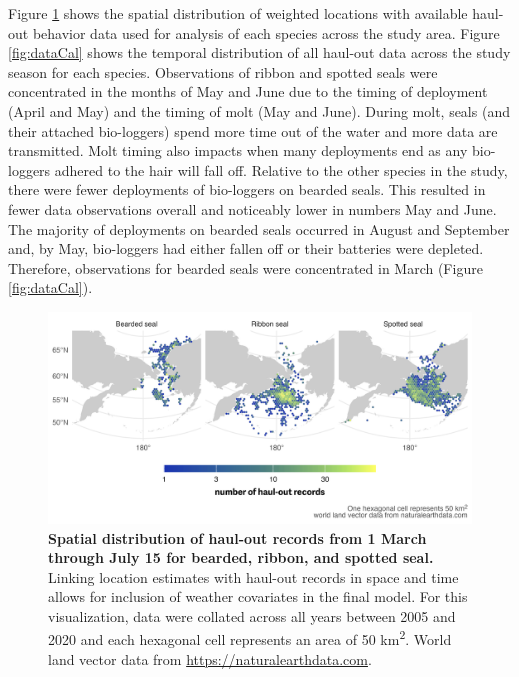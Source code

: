 \documentclass[fleqn,10pt,lineno]{wlpeerj} %
\begin{document}
Figure \ref{fig:dataMap} shows the spatial distribution of weighted locations
with available haul-out behavior data used for analysis of each species across
the study area. Figure \ref{fig:dataCal} shows the temporal distribution of all
haul-out data across the study season for each species. Observations of ribbon
and spotted seals were concentrated in the months of May and June due to the
timing of deployment (April and May) and the timing of molt (May and June).
During molt, seals (and their attached bio-loggers) spend more time out of the
water and more data are transmitted. Molt timing also impacts when many
deployments end as any bio-loggers adhered to the hair will fall off. Relative
to the other species in the study, there were fewer deployments of bio-loggers
on bearded seals. This resulted in fewer data observations overall and
noticeably lower in numbers May and June. The majority of deployments on bearded
seals occurred in August and September and, by May, bio-loggers had either
fallen off or their batteries were depleted. Therefore, observations for bearded
seals were concentrated in March (Figure \ref{fig:dataCal}).



\begin{figure}
\includegraphics[width=1\linewidth]{../figures/Figure-003} \caption{\textbf{Spatial distribution of haul-out records from 1 March through July 15 for bearded, ribbon, and spotted seal.} \linebreak Linking location estimates with haul-out records in space and time allows for inclusion of weather covariates in the final model. For this visualization, data were collated across all years between 2005 and 2020 and each hexagonal cell represents an area of 50 km\textsuperscript{2}. World land vector data from \url{https://naturalearthdata.com}.}\label{fig:dataMap}
\end{figure}
\end{document}
